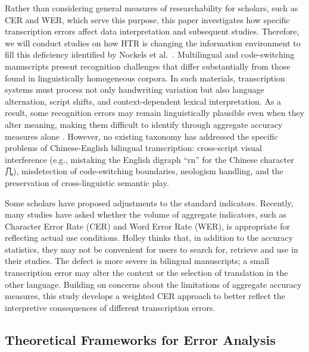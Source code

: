\documentclass[final]{anthology-ch} %
\begin{document}
Rather than considering general measures of researchability for scholars, such as CER and WER, which serve this purpose, this paper investigates how specific transcription errors affect data interpretation and subsequent studies. Therefore, we will conduct studies on how HTR is changing the information environment to fill this deficiency identified by Nockels et al.\ \cite{nockels2022understanding}. Multilingual and code-switching manuscripts present recognition challenges that differ substantially from those found in linguistically homogeneous corpora. In such materials, transcription systems must process not only handwriting variation but also language alternation, script shifts, and context-dependent lexical interpretation. As a result, some recognition errors may remain linguistically plausible even when they alter meaning, making them difficult to identify through aggregate accuracy measures alone \cite{nockels2022understanding}. However, no existing taxonomy has addressed the specific problems of Chinese-English bilingual transcription: cross-script visual interference (e.g., mistaking the English digraph \enquote{rn} for the Chinese character 几), misdetection of code-switching boundaries, neologism handling, and the preservation of cross-linguistic semantic play.

Some scholars have proposed adjustments to the standard indicators. Recently, many studies have asked whether the volume of aggregate indicators, such as Character Error Rate (CER) and Word Error Rate (WER), is appropriate for reflecting actual use conditions. Holley \cite{holley2009how} thinks that, in addition to the accuracy statistics, they may not be convenient for users to search for, retrieve and use in their studies. The defect is more severe in bilingual manuscripts; a small transcription error may alter the context or the selection of translation in the other language. Building on concerns about the limitations of aggregate accuracy measures, this study develops a weighted CER approach to better reflect the interpretive consequences of different transcription errors.

\subsection{Theoretical Frameworks for Error Analysis}
\end{document}
